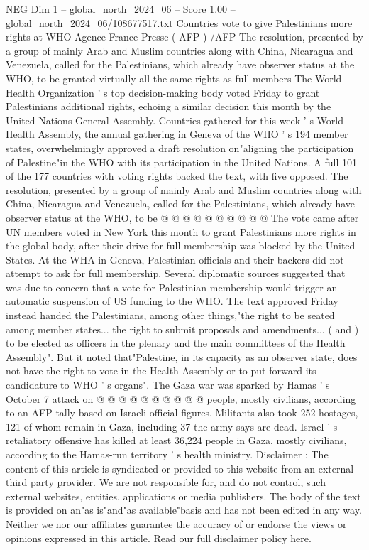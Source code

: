 \begin{textsample}{NEG Dim 1 – global\_north\_2024\_06 – Score 1.00 – global\_north\_2024\_06/108677517.txt}  \label{ex:f1_neg_138}
Countries vote to give Palestinians more rights at WHO Agence France-Presse ( AFP ) /AFP The resolution, presented by a group of mainly Arab and Muslim countries along with China, Nicaragua and Venezuela, called for the Palestinians, which already have observer status at the WHO, to be granted virtually all the same rights as full members The World Health Organization ' s top decision-making body voted Friday to grant Palestinians additional rights, echoing a similar decision this month by the United Nations General Assembly.
Countries gathered for this week ' s World Health Assembly, the annual gathering in Geneva of the WHO ' s 194 member states, overwhelmingly approved a draft resolution on"aligning the participation of Palestine"in the WHO with its participation in the United Nations.
A full 101 of the 177 countries with voting rights backed the text, with five opposed.
The resolution, presented by a group of mainly Arab and Muslim countries along with China, Nicaragua and Venezuela, called for the Palestinians, which already have observer status at the WHO, to be @ @ @ @ @ @ @ @ @ @ The vote came after UN members voted in New York this month to grant Palestinians more rights in the global body, after their drive for full membership was blocked by the United States.
At the WHA in Geneva, Palestinian officials and their backers did not attempt to ask for full membership.
Several diplomatic sources suggested that was due to concern that a vote for Palestinian membership would trigger an automatic suspension of US funding to the WHO.
The text approved Friday instead handed the Palestinians, among other things,"the right to be seated among member states... the right to submit proposals and amendments... ( and ) to be elected as officers in the plenary and the main committees of the Health Assembly".
But it noted that"Palestine, in its capacity as an observer state, does not have the right to vote in the Health Assembly or to put forward its candidature to WHO ' s organs".
The Gaza war was sparked by Hamas ' s October 7 attack on @ @ @ @ @ @ @ @ @ @ people, mostly civilians, according to an AFP tally based on Israeli official figures.
Militants also took 252 hostages, 121 of whom remain in Gaza, including 37 the army says are dead.
Israel ' s retaliatory offensive has killed at least 36,224 people in Gaza, mostly civilians, according to the Hamas-run territory ' s health ministry.
Disclaimer : The content of this article is syndicated or provided to this website from an external third party provider.
We are not responsible for, and do not control, such external websites, entities, applications or media publishers.
The body of the text is provided on an"as is"and"as available"basis and has not been edited in any way.
Neither we nor our affiliates guarantee the accuracy of or endorse the views or opinions expressed in this article.
Read our full disclaimer policy here.

\end{textsample}
